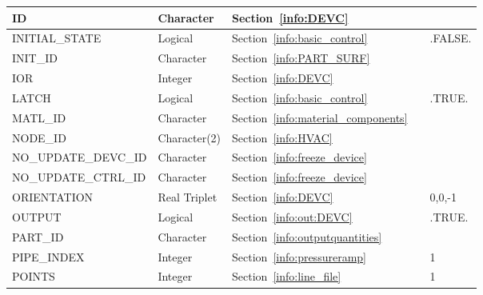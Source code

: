 \documentclass[11pt]{book}
\begin{document}
\begin{longtable}{@{\extracolsep{\fill}}|l|l|l|l|l|}
{\ct ID}                    & Character       & Section~\ref{info:DEVC}                                         &       &               \\ \hline
{\ct INITIAL\_STATE}        & Logical         & Section~\ref{info:basic_control}                                &       & {\ct .FALSE.} \\ \hline
{\ct INIT\_ID}              & Character       & Section~\ref{info:PART_SURF}                                    &       &               \\ \hline
{\ct IOR}                   & Integer         & Section~\ref{info:DEVC}                                         &       &               \\ \hline
{\ct LATCH}                 & Logical         & Section~\ref{info:basic_control}                                &       & {\ct .TRUE.}  \\ \hline
{\ct MATL\_ID}              & Character       & Section~\ref{info:material_components}                          &       &               \\ \hline
{\ct NODE\_ID}              & Character(2)    & Section~\ref{info:HVAC}                                         &       &               \\ \hline
{\ct NO\_UPDATE\_DEVC\_ID}  & Character       & Section~\ref{info:freeze_device}                                &       &               \\ \hline
{\ct NO\_UPDATE\_CTRL\_ID}  & Character       & Section~\ref{info:freeze_device}                                &       &               \\ \hline
{\ct ORIENTATION}           & Real Triplet    & Section~\ref{info:DEVC}                                         &       & 0,0,-1        \\ \hline
{\ct OUTPUT}                & Logical         & Section~\ref{info:out:DEVC}                                     &       & {\ct .TRUE.}  \\ \hline
{\ct PART\_ID}              & Character       & Section~\ref{info:outputquantities}                             &       &               \\ \hline
{\ct PIPE\_INDEX}           & Integer         & Section~\ref{info:pressureramp}                                 &       &  1            \\ \hline
{\ct POINTS}                & Integer         & Section~\ref{info:line_file}                                    &       & 1             \\ \hline

\end{longtable}
\end{document}
